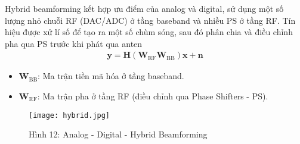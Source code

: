 \documentclass[a4paper,13pt]{article} %
\begin{document}
Hybrid beamforming kết hợp ưu điểm của analog và digital, sử dụng một số lượng nhỏ chuỗi RF (DAC/ADC) ở tầng baseband và nhiều PS ở tầng RF. Tín hiệu được xử lí số để tạo ra một số chùm sóng, sau đó phân chia và điều chỉnh pha qua PS trước khi phát qua anten
\begin{align}
\mathbf{y} = \mathbf{H} (\mathbf{W}_{\text{RF}} \mathbf{W}_{\text{BB}}) \mathbf{x} + \mathbf{n} \tag{7}
\end{align}
\begin{itemize}
    \item \(\mathbf{W}_{\text{BB}}\): Ma trận tiền mã hóa ở tầng baseband.
    \item \(\mathbf{W}_{\text{RF}}\): Ma trận pha ở tầng RF (điều chỉnh qua Phase Shifters - PS).
\end{itemize}

\begin{figure}[htbp]
    \centering
    \texttt{[image: hybrid.jpg]}
    \caption*{Hình 12: Analog - Digital - Hybrid Beamforming  \cite{key8} }
    \label{fig:model}
\end{figure}


\clearpage
\end{document}
